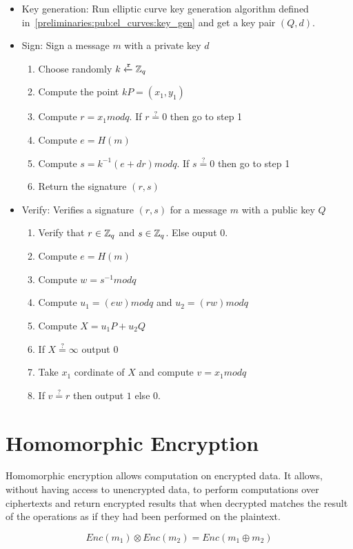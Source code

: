 \begin{itemize}
  \item Key generation: Run elliptic curve key generation algorithm defined in~\ref{preliminaries:pub:el_curves:key_gen} and get a key pair $(Q, d)$.
  \item Sign: Sign a message $m$ with a private key $d$
    \begin{enumerate}
      \item Choose randomly $k \xleftarrow{\mathtt{r}}{\mathbb{Z}_q}$
      \item Compute the point $kP = (x_1, y_1)$
      \item Compute $r = x_1modq$. If $r \stackrel{?}{=} 0$ then go to step 1
      \item Compute $e = H(m)$
      \item Compute $s = k^{-1} (e + dr) modq$. If $s \stackrel{?}{=} 0$ then go to step 1
      \item Return the signature $(r, s)$
    \end{enumerate}
  \item Verify: Verifies a signature $(r, s)$ for a message $m$ with a public key $Q$
    \begin{enumerate}
      \item Verify that $r \in \mathbb{Z}_q$ and $s \in \mathbb{Z}_q$. Else ouput $0$.
      \item Compute $e = H(m)$
      \item Compute $w = s^{-1}modq$
      \item Compute $u_1 = (ew)modq$ and $u_2 = (rw)modq$
      \item Compute $X = u_1P + u_2Q$
      \item If $X \stackrel{?}{=} \infty$ output $0$
      \item Take $x_1$ cordinate of $X$ and compute $v = x_1modq$
      \item If $v \stackrel{?}{=} r$ then output $1$ else $0$.
    \end{enumerate}
\end{itemize}

\section{Homomorphic Encryption}
\label{preliminaries:homo}

Homomorphic encryption allows computation on encrypted data. It allows, without having access to unencrypted data, to perform computations over ciphertexts and return encrypted results that when decrypted matches the result of the operations as if they had been performed on the plaintext.

\begin{equation*}
  Enc(m_1) \otimes Enc(m_2) = Enc(m_1 \oplus m_2)
\end{equation*}
